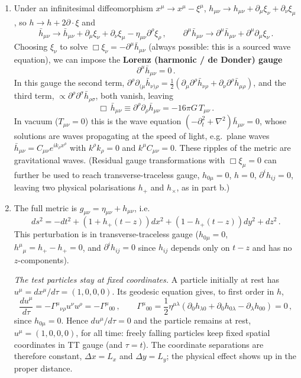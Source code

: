 \documentclass[12pt]{article}
\newcommand{\be}{\begin{equation}}
\newcommand{\ee}{\end{equation}}
\newcommand{\bh}{\bar{h}}
\newcommand{\pa}{\partial}
\begin{document}
\begin{enumerate}[label=\alph*)]
\item Under an infinitesimal diffeomorphism $x^\mu\to x^\mu - \xi^\mu$, $h_{\mu\nu}\to h_{\mu\nu} + \pa_\mu\xi_\nu + \pa_\nu\xi_\mu$,
so $h\to h + 2\pa\cdot\xi$ and
\be
\bh_{\mu\nu}\to \bh_{\mu\nu} + \pa_\mu\xi_\nu + \pa_\nu\xi_\mu - \eta_{\mu\nu}\pa^\rho\xi_\rho\,,
\qquad
\pa^\mu\bh_{\mu\nu}\to\pa^\mu\bh_{\mu\nu} + \pa^\mu\pa_\mu\xi_\nu\,.
\ee
Choosing $\xi_\nu$ to solve $\Box\xi_\nu = -\pa^\mu\bh_{\mu\nu}$ (always possible: this is a sourced wave equation),
we can impose the \textbf{Lorenz (harmonic / de Donder) gauge}
\be
\pa^\mu\bh_{\mu\nu} = 0\,.
\ee
In this gauge the second term,
$\pa^\rho\pa_{(\mu}\bh_{\nu)\rho} = \frac12\left(\pa_\mu\pa^\rho\bh_{\nu\rho} + \pa_\nu\pa^\rho\bh_{\mu\rho}\right)$, and the
third term, $\propto\pa^\rho\pa^\sigma\bh_{\rho\sigma}$, both vanish, leaving
\be
\Box\,\bh_{\mu\nu} \equiv \pa^\rho\pa_\rho\bh_{\mu\nu} = -16\pi G\, T_{\mu\nu}\,.
\ee
In vacuum ($T_{\mu\nu}=0$) this is the wave equation $\left(-\pa_t^2 + \nabla^2\right)\bh_{\mu\nu} = 0$, whose solutions
are waves propagating at the speed of light, e.g.\ plane waves $\bh_{\mu\nu} = C_{\mu\nu}e^{ik_\rho x^\rho}$ with
$k^\rho k_\rho=0$ and $k^\mu C_{\mu\nu}=0$. These ripples of the metric are gravitational waves. (Residual gauge
transformations with $\Box\xi_\mu = 0$ can further be used to reach transverse-traceless gauge, $h_{0\mu}=0$, $h=0$,
$\pa^i h_{ij}=0$, leaving two physical polarisations $h_+$ and $h_\times$, as in part b.)

\item The full metric is $g_{\mu\nu} = \eta_{\mu\nu} + h_{\mu\nu}$, i.e.
\be
ds^2 = -dt^2 + \left(1 + h_+(t-z)\right)dx^2 + \left(1 - h_+(t-z)\right)dy^2 + dz^2\,.
\ee
This perturbation is in transverse-traceless gauge ($h_{0\mu}=0$, $h^\mu{}_\mu = h_+ - h_+ = 0$, and $\pa^i h_{ij}=0$
since $h_{ij}$ depends only on $t-z$ and has no $z$-components).

\emph{The test particles stay at fixed coordinates.} A particle initially at rest has $u^\mu = dx^\mu/d\tau = (1,0,0,0)$.
Its geodesic equation gives, to first order in $h$,
\be
\frac{du^\mu}{d\tau} = -\Gamma^\mu{}_{\nu\rho}u^\nu u^\rho = -\Gamma^\mu{}_{00}\,,\qquad
\Gamma^\mu{}_{00} = \frac12\eta^{\mu\lambda}\left(\pa_0 h_{\lambda0} + \pa_0 h_{0\lambda} - \pa_\lambda h_{00}\right) = 0\,,
\ee
since $h_{0\mu}=0$. Hence $du^\mu/d\tau = 0$ and the particle remains at rest, $u^\mu=(1,0,0,0)$, for all time: freely falling
particles keep fixed spatial coordinates in TT gauge (and $\tau = t$). The coordinate separations are therefore constant,
$\Delta x = L_x$ and $\Delta y = L_y$; the physical effect shows up in the proper distance.


\end{enumerate}
\end{document}
